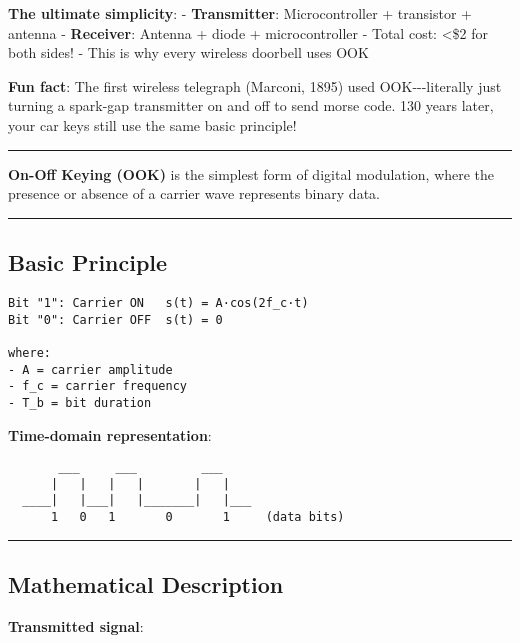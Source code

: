 \textbf{The ultimate simplicity}: - \textbf{Transmitter}:
Microcontroller + transistor + antenna - \textbf{Receiver}: Antenna +
diode + microcontroller - Total cost: \textless\$2 for both sides! -
This is why every wireless doorbell uses OOK

\textbf{Fun fact}: The first wireless telegraph (Marconi, 1895) used
OOK-\/-\/-literally just turning a spark-gap transmitter on and off to
send morse code. 130 years later, your car keys still use the same basic
principle!

\begin{center}\rule{0.5\linewidth}{0.5pt}\end{center}

\textbf{On-Off Keying (OOK)} is the simplest form of digital modulation,
where the presence or absence of a carrier wave represents binary data.

\begin{center}\rule{0.5\linewidth}{0.5pt}\end{center}

\subsection{\texorpdfstring{ Basic
Principle}{ Basic Principle}}\label{basic-principle}

\begin{verbatim}
Bit "1": Carrier ON   s(t) = A·cos(2f_c·t)
Bit "0": Carrier OFF  s(t) = 0

where:
- A = carrier amplitude
- f_c = carrier frequency
- T_b = bit duration
\end{verbatim}

\textbf{Time-domain representation}:

\begin{verbatim}
       ___     ___         ___
      |   |   |   |       |   |
  ____|   |___|   |_______|   |___
      1   0   1       0       1     (data bits)
\end{verbatim}

\begin{center}\rule{0.5\linewidth}{0.5pt}\end{center}

\subsection{\texorpdfstring{ Mathematical
Description}{ Mathematical Description}}\label{mathematical-description}

\textbf{Transmitted signal}:

